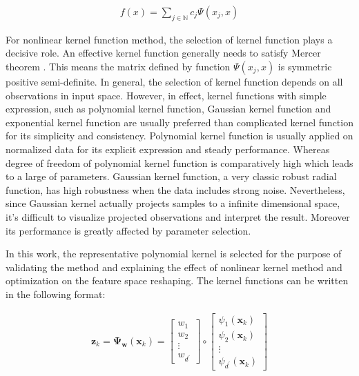 \begin{align}
    f(x) = \sum_{j\in \mathbb{N}}c_j \Psi(x_j,x)
\end{align}

For nonlinear kernel function method, the selection of kernel function plays a decisive role. An effective kernel function generally needs to satisfy Mercer theorem \cite{cristianini2000introduction}. This means the matrix defined by function $\Psi(x_j,x)$ is symmetric positive semi-definite. In general, the selection of kernel function depends on all observations in input space. However, in effect, kernel functions with simple expression, such as polynomial kernel function, Gaussian kernel function and exponential kernel function are usually preferred than complicated kernel function for its simplicity and consistency. Polynomial kernel function is usually applied on normalized data for its explicit expression and steady performance. Whereas degree of freedom of polynomial kernel function is comparatively high which leads to a large of parameters. Gaussian kernel function, a very classic robust radial function, has high robustness when the data includes strong noise. Nevertheless, since Gaussian kernel actually projects samples to a infinite dimensional space, it's difficult to visualize projected observations and interpret the result. Moreover its performance is greatly affected by parameter selection.

In this work, the representative polynomial kernel is selected for the purpose of validating the method and explaining the effect of nonlinear kernel method and optimization on the feature space reshaping. The kernel functions can be written in the following format:

\begin{align}
\mathbf{z}_k
=\mathbf{\Psi_{w}} (\mathbf{x}_k) = 
\begin{bmatrix}
w_{1}  \\
w_{2}   \\
\vdots \\
w_{d^\prime} 
\end{bmatrix}
\circ
\begin{bmatrix}
\psi_1(\mathbf{x}_k)\\
\psi_2(\mathbf{x}_k)\\
\vdots\\
\psi_{d^\prime}(\mathbf{x}_k)
\end{bmatrix}
\label{eq:z}
\end{align}

